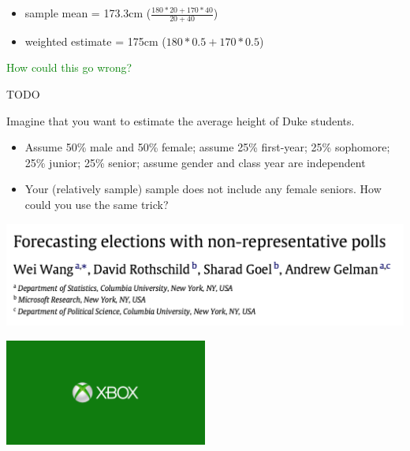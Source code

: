 \documentclass[aspectratio=169]{beamer}
\begin{document}
\begin{frame}

\begin{itemize}
\item sample mean = 173.3cm ($\frac{180 * 20 + 170 * 40}{20 + 40}$)
\pause
\item weighted estimate = 175cm ($180 * 0.5 + 170 * 0.5$)
\end{itemize}
\pause
\textcolor{green}{How could this go wrong?}

\end{frame}
\begin{frame}

TODO

Imagine that you want to estimate the average height of Duke students.\\
\begin{itemize}
\item Assume 50\% male and 50\% female; assume 25\% first-year; 25\% sophomore; 25\% junior; 25\% senior; assume gender and class year are independent
\item Your (relatively sample) sample does not include any female seniors.  How could you use the same trick?
\end{itemize}

\end{frame}
\begin{frame}

\begin{center}
\includegraphics[width=\textwidth]{figures/wang_forecasting_2015_title}
\end{center}

\begin{center}
\includegraphics[width=0.5\textwidth]{figures/xboxlogo}
\end{center}

\end{frame}
\end{document}
